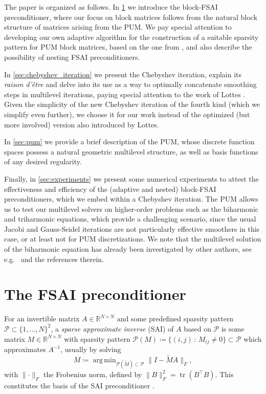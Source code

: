 \documentclass[a4paper]{article}
\newcommand{\norm}[1]{\lVert#1\rVert}
\DeclareMathOperator*{\argmin}{arg\,min}
\DeclareMathOperator{\trace}{tr}
\theoremstyle{plain}
\theoremstyle{definition}
\theoremstyle{remark}
\begin{document}
The paper is organized as follows. In \cref{sec:fsai} we introduce the block-FSAI preconditioner, where our focus on block matrices follows from the natural block structure of matrices arising from the PUM. We pay special attention to developing our own adaptive algorithm for the construction of a suitable sparsity pattern for PUM block matrices, based on the one from \cite{Janna2011}, and also describe the possibility of nesting FSAI preconditioners.

In \cref{sec:chebyshev_iteration} we present the Chebyshev iteration, explain its \emph{raison d'être} and delve into its use as a way to optimally concatenate smoothing steps in multilevel iterations, paying special attention to the work of Lottes \cite{Lottes2023}. Given the simplicity of the new Chebyshev iteration of the fourth kind (which we simplify even further), we choose it for our work instead of the optimized (but more involved) version also introduced by Lottes.

In \cref{sec:pum} we provide a brief description of the PUM, whose discrete function spaces possess a natural geometric multilevel structure, as well as basis functions of any desired regularity.

Finally, in \cref{sec:experiments} we present some numerical experiments to attest the effectiveness and efficiency of the (adaptive and nested) block-FSAI preconditioners, which we embed within a Chebyshev iteration. The PUM allows us to test our multilevel solvers on higher-order problems such as the biharmonic and triharmonic equations, which provide a challenging scenario, since the usual Jacobi and Gauss-Seidel iterations are not particularly effective smoothers in this case, or at least not for PUM discretizations. We note that the multilevel solution of the biharmonic equation has already been investigated by other authors, see e.g.\ \cite{Sogn2019} and the references therein.


\section{The FSAI preconditioner}\label{sec:fsai}

For an invertible matrix \(A\in \mathbb{R}^{N\times N}\) and some predefined sparsity pattern \(\mathcal{P} \subset \{1, \dots, N\}^2\), a \emph{sparse approximate inverse} (SAI) of \(A\) based on \(\mathcal{P}\) is some matrix \(M\in \mathbb{R}^{N\times N}\) with sparsity pattern \(\mathcal{P}(M) \coloneqq \{(i,j) \,\colon\, M_{ij} \neq 0\} \subset \mathcal{P}\) which approximates \(A^{-1}\), usually by solving
\begin{equation*}
	M \coloneqq \argmin_{\mathcal{P}(\tilde{M}) \subset \mathcal{P}} \norm{I - \tilde{M} A}_F,
\end{equation*}
with \(\norm{\cdot}_F\) the Frobenius norm, defined by \(\norm{B}_F^2 = \trace(B^{\top} B)\). This constitutes the basis of the SAI preconditioner \cite{Sedlacek2012}.
\end{document}
